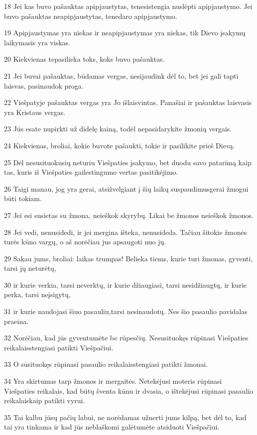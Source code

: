 \par 18 Jei kas buvo pašauktas apipjaustytas, tenesistengia nuslėpti apipjaustymo. Jei buvo pašauktas neapipjaustytas, tenedaro apipjaustymo. 
\par 19 Apipjaustymas yra niekas ir neapipjaustymas yra niekas, tik Dievo įsakymų laikymasis yra viskas. 
\par 20 Kiekvienas tepasilieka toks, koks buvo pašauktas. 
\par 21 Jei buvai pašauktas, būdamas vergas, nesijaudink dėl to, bet jei gali tapti laisvas, pasinaudok proga. 
\par 22 Viešpatyje pašauktas vergas yra Jo išlaisvintas. Panašiai ir pašauktas laisvasis yra Kristaus vergas. 
\par 23 Jūs esate nupirkti už didelę kainą, todėl nepasidarykite žmonių vergais. 
\par 24 Kiekvienas, broliai, kokie buvote pašaukti, tokie ir pasilikite prieš Dievą. 
\par 25 Dėl nesusituokusių neturiu Viešpaties įsakymo, bet duodu savo patarimą kaip tas, kuris iš Viešpaties gailestingumo vertas pasitikėjimo. 
\par 26 Taigi manau, jog yra gerai, atsižvelgiant į šių laikų suspaudimus­gerai žmogui būti tokiam. 
\par 27 Jei esi susietas su žmona, neieškok skyrybų. Likai be žmonos­ neieškok žmonos. 
\par 28 Jei vedi, nenusidedi, ir jei mergina išteka, nenusideda. Tačiau šitokie žmonės turės kūno vargų, o aš norėčiau jus apsaugoti nuo jų. 
\par 29 Sakau jums, broliai: laikas trumpas! Belieka tiems, kurie turi žmonas, gyventi, tarsi jų neturėtų, 
\par 30 ir kurie verkia, tarsi neverktų, ir kurie džiaugiasi, tarsi nesidžiaugtų, ir kurie perka, tarsi neįsigytų, 
\par 31 ir kurie naudojasi šiuo pasauliu,­tarsi nesinaudotų. Nes šio pasaulio pavidalas praeina. 
\par 32 Norėčiau, kad jūs gyventumėte be rūpesčių. Nesusituokęs rūpinasi Viešpaties reikalais­stengiasi patikti Viešpačiui. 
\par 33 O susituokęs rūpinasi pasaulio reikalais­stengiasi patikti žmonai. 
\par 34 Yra skirtumas tarp žmonos ir mergaitės. Netekėjusi moteris rūpinasi Viešpaties reikalais, kad būtų šventa kūnu ir dvasia, o ištekėjusi rūpinasi pasaulio reikalais­kaip patikti vyrui. 
\par 35 Tai kalbu jūsų pačių labui, ne norėdamas užnerti jums kilpą, bet dėl to, kad tai yra tinkama ir kad jūs neblaškomi galėtumėte atsiduoti Viešpačiui. 
